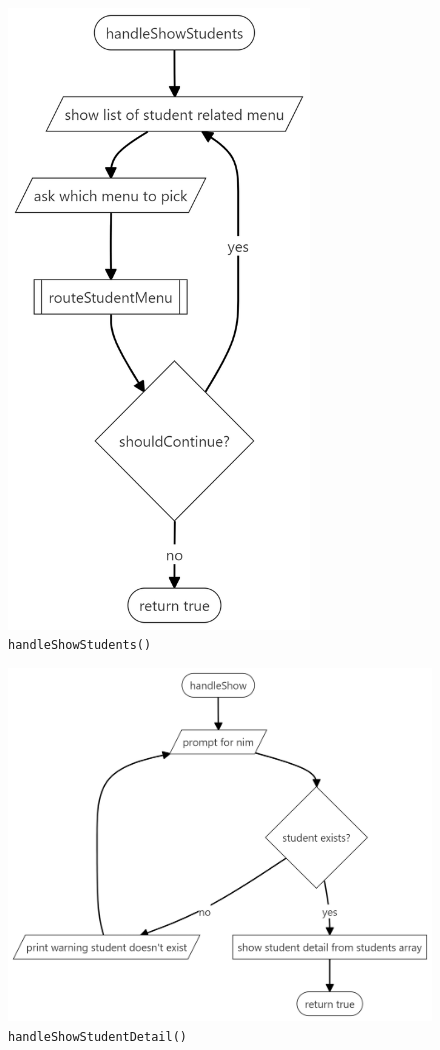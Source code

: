 \documentclass[12pt,titlepage]{article}
\begin{document}
\begin{figure}[h]
    \centering
    \includegraphics[width=8cm]{flowcharts/student-menu.png}
    \caption{\texttt{handleShowStudents()}}
\end{figure}

\pagebreak

\begin{figure}[h]
    \centering
    \includegraphics[width=.8\textwidth]{flowcharts/handle-show-student-detail.png}
    \caption{\texttt{handleShowStudentDetail()}}
\end{figure}
\end{document}
